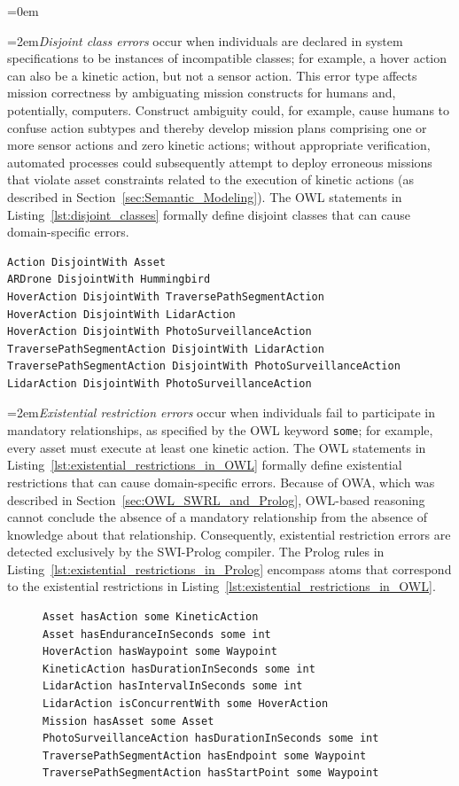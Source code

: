 {
\parindent=0em

\newcommand{\myindent}[1]{\hangindent=2em\emph{#1}}

\myindent{Disjoint class errors} occur when individuals are declared in system specifications to be instances of incompatible classes; for example, a hover action can also be a kinetic action, but not a sensor action. This error type affects mission correctness by ambiguating mission constructs for humans and, potentially, computers. Construct ambiguity could, for example, cause humans to confuse action subtypes and thereby develop mission plans comprising one or more sensor actions and zero kinetic actions; without appropriate verification, automated processes could subsequently attempt to deploy erroneous missions that violate asset constraints related to the execution of kinetic actions (as described in Section~\ref{sec:Semantic_Modeling}). The OWL statements in Listing~\ref{lst:disjoint_classes} formally define disjoint classes that can cause domain-specific errors.

\begin{lstlisting}[caption={Disjoint class statements specified in OWL},label=lst:disjoint_classes]
Action DisjointWith Asset
ARDrone DisjointWith Hummingbird
HoverAction DisjointWith TraversePathSegmentAction
HoverAction DisjointWith LidarAction
HoverAction DisjointWith PhotoSurveillanceAction
TraversePathSegmentAction DisjointWith LidarAction
TraversePathSegmentAction DisjointWith PhotoSurveillanceAction
LidarAction DisjointWith PhotoSurveillanceAction
\end{lstlisting}

\myindent{Existential restriction errors} occur when individuals fail to participate in mandatory relationships, as specified by the OWL keyword \texttt{some}; for example, every asset must execute at least one kinetic action. The OWL statements in Listing~\ref{lst:existential_restrictions_in_OWL} formally define existential restrictions that can cause domain-specific errors. Because of OWA, which was described in Section~\ref{sec:OWL_SWRL_and_Prolog}, OWL-based reasoning cannot conclude the absence of a mandatory relationship from the absence of knowledge about that relationship. Consequently, existential restriction errors are detected exclusively by the SWI-Prolog compiler. The Prolog rules in Listing~\ref{lst:existential_restrictions_in_Prolog} encompass atoms that correspond to the existential restrictions in Listing~\ref{lst:existential_restrictions_in_OWL}.

\begin{figure}[ht]
\begin{lstlisting}[caption={Existential restriction statements specified in OWL},label=lst:existential_restrictions_in_OWL]
Asset hasAction some KineticAction
Asset hasEnduranceInSeconds some int
HoverAction hasWaypoint some Waypoint
KineticAction hasDurationInSeconds some int
LidarAction hasIntervalInSeconds some int
LidarAction isConcurrentWith some HoverAction
Mission hasAsset some Asset
PhotoSurveillanceAction hasDurationInSeconds some int
TraversePathSegmentAction hasEndpoint some Waypoint
TraversePathSegmentAction hasStartPoint some Waypoint
\end{lstlisting}
\end{figure}

}

